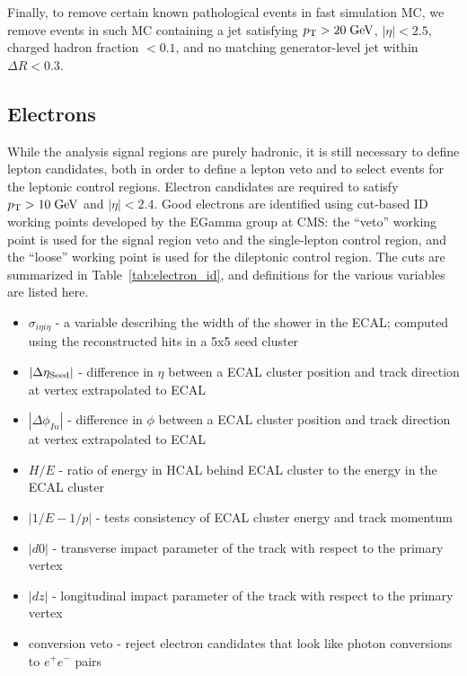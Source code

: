 Finally, to remove certain known pathological events in fast simulation MC, we remove events in such MC containing
a jet satisfying $p_{\mathrm{T}}>20\;\text{Ge\hspace{-.08em}V}$, $|\eta|<2.5$, charged hadron fraction $<0.1$, and no matching generator-level jet
within $\Delta R<0.3$.

\subsection{Electrons}
\label{sec:electrons}

While the analysis signal regions are purely hadronic, it is still necessary to define lepton candidates, 
both in order to define a lepton veto and to select events for the leptonic control regions.
Electron candidates are required to satisfy $p_{\mathrm{T}}>10\;\text{Ge\hspace{-.08em}V}$ and $|\eta|<2.4$. Good electrons are identified
using cut-based ID working points developed by the EGamma group at CMS: the ``veto'' working point is used for
the signal region veto and the single-lepton control region, and the ``loose'' working point is used for
the dileptonic \zll control region. The cuts are summarized in Table~\ref{tab:electron_id}, and definitions
for the various variables are listed here.
\begin{itemize}\setlength\itemsep{-1mm}
\item $\sigma_{i\eta i\eta}$ - a variable describing the width of the shower in the ECAL; computed using the 
reconstructed hits in a 5x5 seed cluster
\item $|\Delta\eta_{\mathrm{Seed}}|$ - difference in $\eta$ between a ECAL cluster position and track direction at vertex extrapolated to ECAL
\item $|\Delta\phi_{In}|$ - difference in $\phi$ between a ECAL cluster position and track direction at vertex extrapolated to ECAL
\item $H/E$ - ratio of energy in HCAL behind ECAL cluster to the energy in the ECAL cluster
\item $|1/E-1/p|$ - tests consistency of ECAL cluster energy and track momentum
\item $|d0|$ - transverse impact parameter of the track with respect to the primary vertex
\item $|dz|$ - longitudinal impact parameter of the track with respect to the primary vertex
\item conversion veto - reject electron candidates that look like photon conversions to $e^+e^-$ pairs
\end{itemize}


